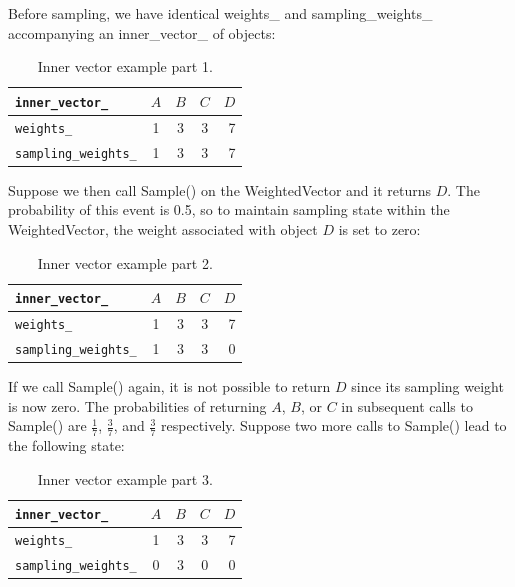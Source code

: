 \documentclass[12pt]{article}
\begin{document}
    Before sampling, we have identical weights\_ and sampling\_weights\_
    accompanying an inner\_vector\_ of objects:

    \begin{table}
      \caption{Inner vector example part 1.}
      \begin{center}
      \begin{tabular}{ | l | c | c | c | r | }
        \hline
        \verb|inner_vector_| & $A$ & $B$ & $C$ & $D$ \\ \hline
        \verb|weights_| & 1 & 3 & 3 & 7 \\ \hline
        \verb|sampling_weights_| & 1 & 3 & 3 & 7 \\ \hline
        \hline
      \end{tabular}
      \end{center}
    \end{table}

    Suppose we then call Sample() on the WeightedVector and it returns $D$. The
    probability of this event is 0.5, so to maintain sampling state within the
    WeightedVector, the weight associated with object $D$ is set to zero:

    \begin{table}
      \caption{Inner vector example part 2.}
      \begin{center}
      \begin{tabular}{ | l | c | c | c | r | }
        \hline
        \verb|inner_vector_| & $A$ & $B$ & $C$ & $D$ \\ \hline
        \verb|weights_| & 1 & 3 & 3 & 7 \\ \hline
        \verb|sampling_weights_| & 1 & 3 & 3 & 0 \\ \hline
        \hline
      \end{tabular}
      \end{center}
    \end{table}

    If we call Sample() again, it is not possible to return $D$ since its
    sampling weight is now zero. The probabilities of returning $A$, $B$, or
    $C$ in subsequent calls to Sample() are $\frac{1}{7}$, $\frac{3}{7}$, and
    $\frac{3}{7}$ respectively. Suppose two more calls to Sample() lead to the
    following state:

    \begin{table}
      \caption{Inner vector example part 3.}
      \begin{center}
      \begin{tabular}{ | l | c | c | c | r | }
        \hline
        \verb|inner_vector_| & $A$ & $B$ & $C$ & $D$ \\ \hline
        \verb|weights_| & 1 & 3 & 3 & 7 \\ \hline
        \verb|sampling_weights_| & 0 & 3 & 0 & 0 \\ \hline
        \hline
      \end{tabular}
      \end{center}
    \end{table}
\end{document}
